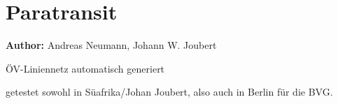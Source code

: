 
\section{Paratransit}
\label{sec:paratransit}
\hfill \textbf{Author:} Andreas Neumann, Johann W. Joubert

\citet[][]{Neumann_PhDThesis_2014}
ÖV-Liniennetz automatisch generiert 

getestet sowohl in Süafrika/Johan Joubert, also auch in Berlin für die BVG.









